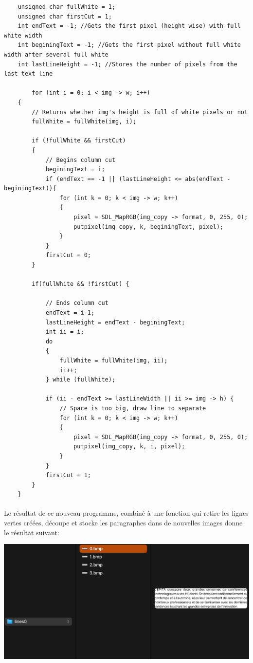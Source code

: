 \documentclass{article}
\begin{document}
	\begin{lstlisting}
    unsigned char fullWhite = 1;
    unsigned char firstCut = 1;
    int endText = -1; //Gets the first pixel (height wise) with full white width
    int beginingText = -1; //Gets the first pixel without full white width after several full white 
    int lastLineHeight = -1; //Stores the number of pixels from the last text line
    
		for (int i = 0; i < img -> w; i++) 
    {
        // Returns whether img's height is full of white pixels or not
        fullWhite = fullWhite(img, i);

        if (!fullWhite && firstCut)
        {   
            // Begins column cut
            beginingText = i;
            if (endText == -1 || (lastLineHeight <= abs(endText - beginingText)){
                for (int k = 0; k < img -> w; k++)
                {
                    pixel = SDL_MapRGB(img_copy -> format, 0, 255, 0);
                    putpixel(img_copy, k, beginingText, pixel);
                }   
            }
            firstCut = 0;
        }
        
        if(fullWhite && !firstCut) {
        
            // Ends column cut
            endText = i-1;
            lastLineHeight = endText - beginingText;
            int ii = i;
            do
            {
                fullWhite = fullWhite(img, ii);
                ii++;
            } while (fullWhite);
            
            if (ii - endText >= lastLineWidth || ii >= img -> h) {
                // Space is too big, draw line to separate
                for (int k = 0; k < img -> w; k++)
                {
                    pixel = SDL_MapRGB(img_copy -> format, 0, 255, 0);
                    putpixel(img_copy, k, i, pixel);
                }
            }
            firstCut = 1;
        }
    }	
	\end{lstlisting}
	
	\paragraph{}
	Le résultat de ce nouveau programme, combiné à une fonction qui retire les lignes vertes créées, découpe et stocke les paragraphes dans de nouvelles images donne le résultat suivant: 
	
	\begin{center}
		\includegraphics[scale=0.4]{cutColumns}
	\end{center}
	
\end{document}
